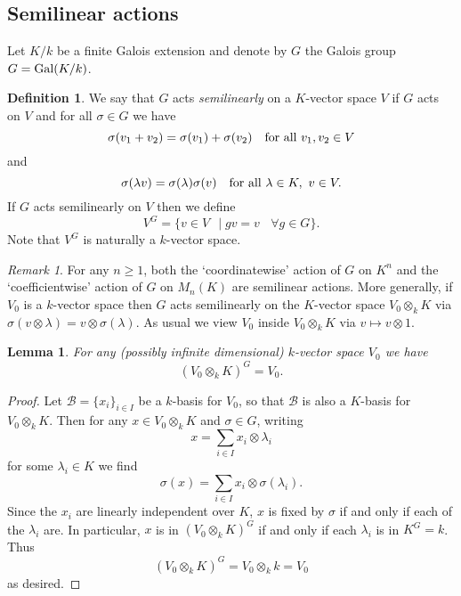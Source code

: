 \documentclass[11pt]{amsart}
\numberwithin{equation}{section}
\newtheorem{lemma}[equation]{Lemma}
\theoremstyle{remark}
\newtheorem{remark}[equation]{Remark}
\theoremstyle{remark}
\theoremstyle{remark}
\theoremstyle{definition}
\theoremstyle{definition}
\theoremstyle{definition}
\newtheorem{defi}[equation]{Definition}
\theoremstyle{definition}
\theoremstyle{definition}
\theoremstyle{definition}
\begin{document}
\subsection{Semilinear actions} \label{semilinear actions}

 Let $K/k$ be a finite Galois extension and denote by $G$ the Galois group $G=\textup{Gal}(K/k)$.
 
 \begin{defi}
 We say that $G$ acts \textit{semilinearly} on a $K$-vector space $V$ if $G$ acts on $V$ and for all $\sigma\in G$ we have
\[\sigma(v_1+v_2)=\sigma(v_1)+\sigma(v_2)~~~\textup{for all }v_1,v_2\in V\]
and 
\[\sigma(\lambda v)=\sigma(\lambda)\sigma(v)~~~\textup{for all }\lambda\in K,~v\in V.\]
If $G$ acts semilinearly on $V$ then we define
\[V^G=\{v\in V~~\mid gv=v~~~~\forall g\in G\}.\]
Note that $V^G$ is naturally a $k$-vector space.
\end{defi}

\begin{remark}
For any $n\geq 1$, both the `coordinatewise' action of $G$ on $K^n$ and the `coefficientwise' action of $G$ on $M_n(K)$ are semilinear actions.
More generally, if $V_0$ is a $k$-vector space then $G$ acts semilinearly on the $K$-vector space $V_0\otimes_kK$  via $\sigma(v\otimes \lambda)=v\otimes \sigma(\lambda)$. 
As usual we view $V_0$ inside $V_0\otimes_k K$ via $v\mapsto v\otimes 1$.
 \end{remark}

\begin{lemma} \label{invariance of tensor product}
For any (possibly infinite dimensional) $k$-vector space $V_0$ we have
\[(V_0\otimes_kK)^G=V_0.\]
\end{lemma}

\begin{proof}
Let $\mathcal{B}=\{x_i\}_{i\in I}$ be a $k$-basis for $V_0$, so that $\mathcal{B}$ is also a $K$-basis for $V_0\otimes_kK$. Then for any $x\in V_0\otimes_kK$ and $\sigma \in G$, writing\[x=\sum_{i\in I}x_i\otimes \lambda_i\]
for some $\lambda_i\in K$ we find
\[\sigma(x)=\sum_{i\in I}x_i\otimes \sigma(\lambda_i).\]
Since the $x_i$ are linearly independent over $K$, $x$ is fixed by $\sigma$ if and only if each of the $\lambda_i$ are. In particular, $x$ is in $(V_0\otimes_kK)^G$ if and only if each $\lambda_i$ is in $K^G=k$. Thus
\[(V_0\otimes_kK)^G=V_0\otimes_kk=V_0\]
as desired.
\end{proof}
\end{document}
